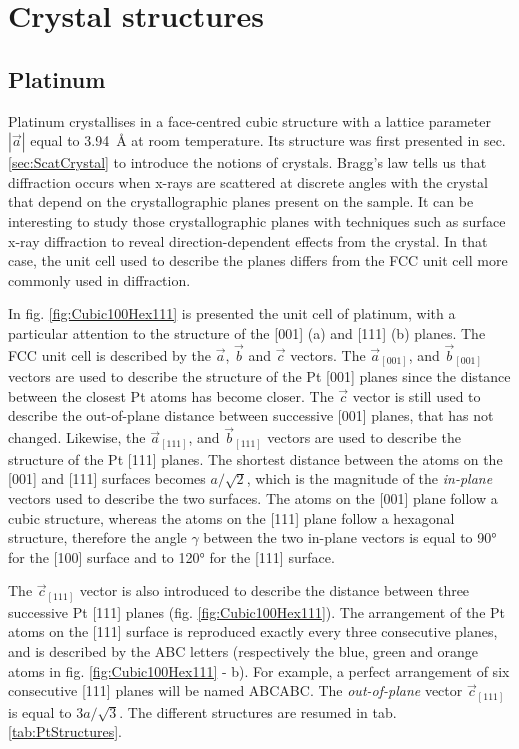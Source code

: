 \section{Crystal structures}\label{sec:Structures}

\subsection{Platinum}

Platinum crystallises in a face-centred cubic structure with a lattice parameter $|\vec{a}|$ equal to \qty{3.94}{\angstrom} at room temperature.
Its structure was first presented in sec. \ref{sec:ScatCrystal} to introduce the notions of crystals.
Bragg's law tells us that diffraction occurs when x-rays are scattered at discrete angles with the crystal that depend on the crystallographic planes present on the sample.
It can be interesting to study those crystallographic planes with techniques such as surface x-ray diffraction to reveal direction-dependent effects from the crystal.
In that case, the unit cell used to describe the planes differs from the FCC unit cell more commonly used in diffraction.

In fig. \ref{fig:Cubic100Hex111} is presented the unit cell of platinum, with a particular attention to the structure of the [001] (a) and [111] (b) planes.
The FCC unit cell is described by the $\vec{a}$, $\vec{b}$ and $\vec{c}$ vectors.
The $\vec{a}_{[001]}$, and $\vec{b}_{[001]}$ vectors are used to describe the structure of the Pt [001] planes since the distance between the closest Pt atoms has become closer.
The $\vec{c}$ vector is still used to describe the out-of-plane distance between successive [001] planes, that has not changed.
Likewise, the $\vec{a}_{[111]}$, and $\vec{b}_{[111]}$ vectors are used to describe the structure of the Pt [111] planes.
The shortest distance between the atoms on the [001] and [111] surfaces becomes $a/\sqrt{2}$, which is the magnitude of the \textit{in-plane} vectors used to describe the two surfaces.
The atoms on the [001] plane follow a cubic structure, whereas the atoms on the [111] plane follow a hexagonal structure, therefore the angle $\gamma$ between the two in-plane vectors is equal to \ang{90} for the [100] surface and to \ang{120} for the [111] surface.

The $\vec{c}_{[111]}$ vector is also introduced to describe the distance between three successive Pt [111] planes (fig. \ref{fig:Cubic100Hex111}).
The arrangement of the Pt atoms on the [111] surface is reproduced exactly every three consecutive planes, and is described by the ABC letters (respectively the blue, green and orange atoms in fig. \ref{fig:Cubic100Hex111} - b).
For example, a perfect arrangement of six consecutive [111] planes will be named ABCABC.
The \textit{out-of-plane} vector $\vec{c}_{[111]}$ is equal to $3a/\sqrt{3}$.
The different structures are resumed in tab. \ref{tab:PtStructures}.

